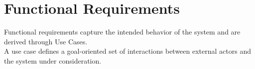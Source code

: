 \section{Functional Requirements}

Functional requirements capture the intended behavior of the system and are derived through Use Cases.\\
A use case defines a goal-oriented set of interactions between external actors and the system under consideration. 





